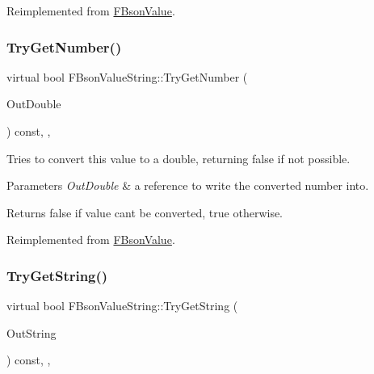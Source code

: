 Reimplemented from \mbox{\hyperlink{class_f_bson_value_a1c7d6b561d3cc8a7db99b850740c642e}{F\+Bson\+Value}}.

\mbox{\label{class_f_bson_value_string_a7346681867daa27d7fa4a4e690ba55aa}} 
\subsubsection{\texorpdfstring{Try\+Get\+Number()}{TryGetNumber()}}
{\footnotesize\ttfamily virtual bool F\+Bson\+Value\+String\+::\+Try\+Get\+Number (\begin{DoxyParamCaption}\item[{double \&}]{Out\+Double }\end{DoxyParamCaption}) const\hspace{0.3cm}{\ttfamily [inline]}, {\ttfamily [override]}, {\ttfamily [virtual]}}

Tries to convert this value to a double, returning false if not possible.


\begin{DoxyParams}{Parameters}
{\em Out\+Double} & a reference to write the converted number into. \\
\hline
\end{DoxyParams}
\begin{DoxyReturn}{Returns}
false if value can\textquotesingle{}t be converted, true otherwise. 
\end{DoxyReturn}


Reimplemented from \mbox{\hyperlink{class_f_bson_value_a519904f85122172ad9ca2f6b0b144f26}{F\+Bson\+Value}}.

\mbox{\label{class_f_bson_value_string_a531bcc8511d8de17418fd7fe6d0d797f}} 
\subsubsection{\texorpdfstring{Try\+Get\+String()}{TryGetString()}}
{\footnotesize\ttfamily virtual bool F\+Bson\+Value\+String\+::\+Try\+Get\+String (\begin{DoxyParamCaption}\item[{F\+String \&}]{Out\+String }\end{DoxyParamCaption}) const\hspace{0.3cm}{\ttfamily [inline]}, {\ttfamily [override]}, {\ttfamily [virtual]}}

